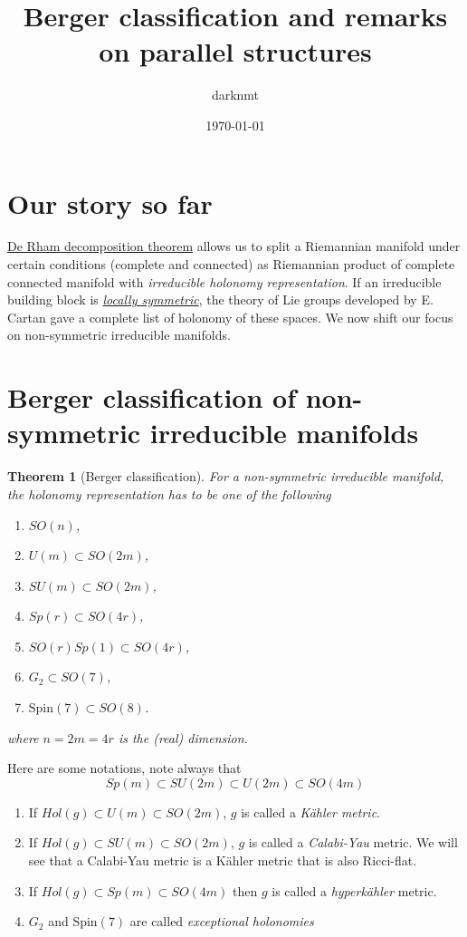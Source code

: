 \documentclass[11pt]{article}
\author{darknmt}
\date{\today}
\title{Berger classification and remarks on parallel structures}
\newtheorem{theorem}{Theorem}
\begin{document}
\maketitle
\tableofcontents


\section{Our story so far}
\label{sec:orgd2f81bf}

\href{./de-rham-decomposition.org}{De Rham decomposition theorem} allows us to split a Riemannian manifold under certain conditions
(complete and connected) as Riemannian product of complete connected manifold with \emph{irreducible
holonomy representation}. If an irreducible building block is \href{./symmetric-space.org}{\emph{locally symmetric}}, the theory of Lie
groups developed by E. Cartan gave a complete list of holonomy of these spaces. We now shift our
focus on non-symmetric irreducible manifolds.


\section{Berger classification of non-symmetric irreducible manifolds}
\label{sec:orgbb18e66}

\begin{theorem}[Berger classification]
\label{thm:Berger}
\label{orgca570d1}
For a non-symmetric irreducible manifold, the holonomy representation has to be one of the
following
\begin{enumerate}
\item \(SO(n)\),
\item \(U(m)\subset SO(2m)\),
\item \(SU(m)\subset SO(2m)\),
\item \(Sp(r) \subset SO(4r)\),
\item \(SO(r)Sp(1) \subset SO(4r)\),
\item \(G_2\subset SO(7)\),
\item \(\text{Spin}(7)\subset SO(8)\).
\end{enumerate}
where \(n=2m=4r\) is the (real) dimension.
\end{theorem}

Here are some notations, note always that
\[
Sp(m)\subset SU(2m)\subset U(2m)\subset SO(4m)
\]
\begin{enumerate}
\item If \(Hol(g)\subset U(m)\subset SO(2m)\), \(g\) is called a \emph{Kähler metric}.
\item If \(Hol(g)\subset SU(m)\subset SO(2m)\), \(g\) is called a \emph{Calabi-Yau} metric. We will see that a
Calabi-Yau metric is a Kähler metric that is also Ricci-flat.
\item If \(Hol(g)\subset Sp(m)\subset SO(4m)\) then \(g\) is called a \emph{hyperkähler} metric.
\item \(G_2\) and \(\text{Spin}(7)\) are called \emph{exceptional holonomies}
\end{enumerate}
\end{document}
